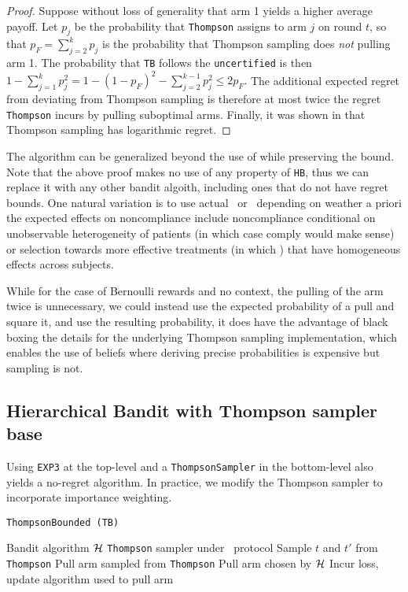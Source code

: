 \begin{proof}	
	Suppose without loss of generality that arm 1 yields a higher average payoff. Let $p_j$ be the probability that \texttt{Thompson} assigns to arm $j$ on round $t$, so that $p_F=\sum_{j=2}^kp_j$ is the probability that Thompson sampling does \emph{not} pulling arm 1. The probability that \texttt{TB} follows the \texttt{uncertified} is then 
	$1-\sum_{j=1}^kp_j^2  = 
	    1-(1-p_F)^2 - \sum_{j=2}^{k-1}p_j^2 \leq 2p_F.$
	The additional expected regret from deviating from Thompson sampling is therefore at most twice the regret \texttt{Thompson} incurs by pulling suboptimal arms. Finally, it was shown in \cite{agrawal:12,kaufmann:12} that Thompson sampling has logarithmic regret.
\end{proof}

The algorithm can be generalized beyond the use of while preserving the bound. Note that the above proof makes no use of any property of \texttt{HB}, thus we can replace it with any other bandit algoith, including ones that do not have regret bounds. One natural variation is to use actual  \actual\ or \comply\ depending on weather a priori the expected effects on noncompliance include noncompliance conditional on unobservable heterogeneity of patients  (in which case comply would make sense) or selection towards more effective treatments (in which ) that have homogeneous effects across subjects.

While for the case of Bernoulli rewards and no context, the pulling of the arm twice is unnecessary, we could instead use the expected probability of a pull and square it, and use the resulting probability, it does have the advantage of black boxing the details for the underlying Thompson sampling implementation, which enables the use of beliefs where deriving precise probabilities is expensive but sampling is not. 


\subsection{Hierarchical Bandit with Thompson sampler base}


Using  \texttt{EXP3} at the top-level and a \texttt{ThompsonSampler} in the  bottom-level also yields a no-regret algorithm. In practice, we modify the Thompson sampler to incorporate importance weighting.

\begin{algorithm}
   \caption{\texttt{ThompsonBounded (TB)}}
   \label{alg:dt}
   \begin{algorithmic}   
    Bandit algorithm ${\mathcal H}$
    \texttt{Thompson} sampler under \chosen\, protocol
	\STATE Sample $t$ and $t'$ from \texttt{Thompson}
	\STATE Pull arm sampled from \texttt{Thompson}
	\ELSE
	\STATE Pull arm chosen by ${\mathcal H}$
	\ENDIF
	\STATE Incur loss, update algorithm used to pull arm
   	\ENDFOR
   	\end{algorithmic}
\end{algorithm}



